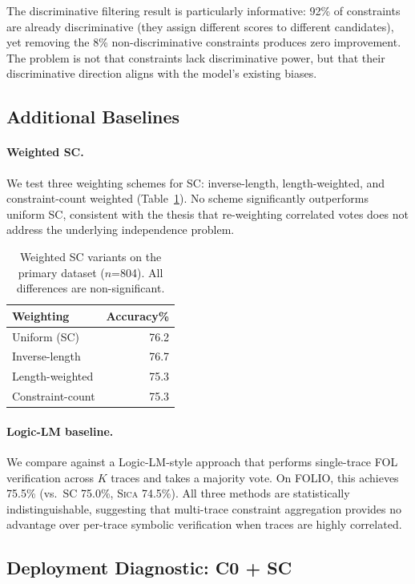 \documentclass[11pt,a4paper]{article}
\newcommand{\sica}{\textsc{Sica}}
\begin{document}
The discriminative filtering result is particularly informative: 92\% of constraints are already discriminative (they assign different scores to different candidates), yet removing the 8\% non-discriminative constraints produces zero improvement.
The problem is not that constraints lack discriminative power, but that their discriminative direction aligns with the model's existing biases.

\subsection{Additional Baselines}

\paragraph{Weighted SC.}
We test three weighting schemes for SC: inverse-length, length-weighted, and constraint-count weighted (Table~\ref{tab:weightedsc}).
No scheme significantly outperforms uniform SC, consistent with the thesis that re-weighting correlated votes does not address the underlying independence problem.

\begin{table}[t]
\centering
\caption{Weighted SC variants on the primary dataset ($n$=804). All differences are non-significant.}
\label{tab:weightedsc}
\small
\begin{tabular}{lr}
\toprule
Weighting & Accuracy\% \\
\midrule
Uniform (SC) & 76.2 \\
Inverse-length & 76.7 \\
Length-weighted & 75.3 \\
Constraint-count & 75.3 \\
\bottomrule
\end{tabular}
\end{table}

\paragraph{Logic-LM baseline.}
We compare against a Logic-LM-style approach that performs single-trace FOL verification across $K$ traces and takes a majority vote.
On FOLIO, this achieves 75.5\% (vs.\ SC 75.0\%, \sica{} 74.5\%).
All three methods are statistically indistinguishable, suggesting that multi-trace constraint aggregation provides no advantage over per-trace symbolic verification when traces are highly correlated.

\subsection{Deployment Diagnostic: C0 + SC}
\end{document}
